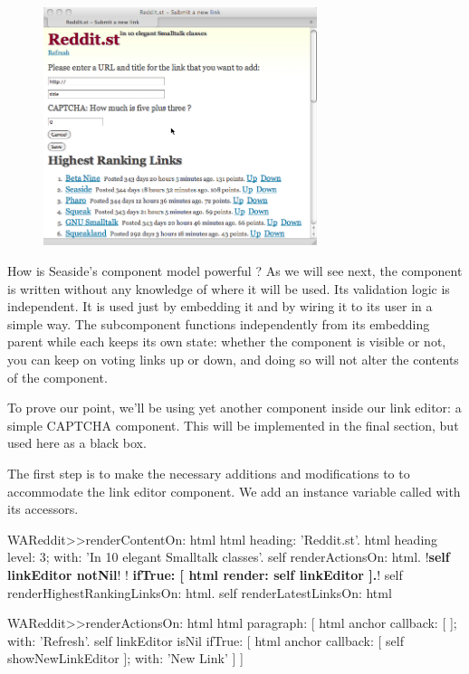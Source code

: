 \documentclass[a4paper,10pt,twoside]{book}
\begin{document}
\begin{figure}\begin{center}
\includegraphics[width=8cm]{redditNewLink}
\caption{}
\end{center}
\end{figure}


How is Seaside's component model powerful ? As we will see next, the component is written without any knowledge of where it will be used. Its validation logic is independent. It is used just by embedding it and by wiring it to its user in a simple way. The subcomponent functions independently from its embedding parent while each keeps its own state: whether the component is visible or not, you can keep on voting links up or down, and doing so will not alter the contents of the component.


To prove our point, we'll be using yet another component inside our link editor: a simple CAPTCHA component. This will be implemented in the final section, but used here as a black box.

The first step is to make the necessary additions and modifications to  to accommodate the link editor component. We add an instance variable called  with its accessors.

\begin{code}{}
WAReddit>>renderContentOn: html
     html heading: 'Reddit.st'. 
     html heading level: 3; with: 'In 10 elegant Smalltalk classes'. 
     self renderActionsOn: html. 
     !\textbf{self linkEditor notNil}!
        !\textbf{     ifTrue: [ html render: self linkEditor ].}!
     self renderHighestRankingLinksOn: html. 
     self renderLatestLinksOn: html
\end{code}


\begin{code}{}
WAReddit>>renderActionsOn: html
     html paragraph: [ 
     	html anchor callback: [ ]; with: 'Refresh'. 
     	self linkEditor isNil ifTrue: [
     	html anchor callback: [ self showNewLinkEditor ]; with: 'New Link' ] ]
\end{code}
\end{document}
